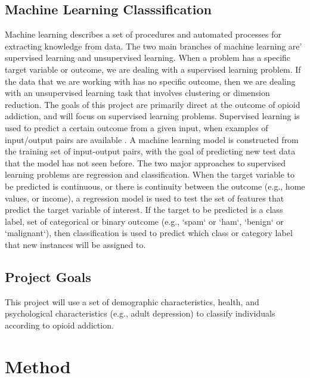 \documentclass[sigconf]{acmart}
\begin{document}
\subsection{Machine Learning Classsification} 

Machine learning describes a set of procedures and automated processes for 
extracting knowledge from data. The two main branches of machine learning are'
supervised learning and unsupervised learning. When a problem has a specific 
target variable or outcome, we are dealing with a supervised learning problem. 
If the data that we are working with has no specific outcome, then we are
dealing with an unsupervised learning task that involves clustering or 
dimension reduction. The goals of this project are primarily direct at the 
outcome of opioid addiction, and will focus on supervised learning problems. 
Supervised learning is used to predict a certain outcome from a given input,
when examples of input/output pairs are available \cite{muller17}. A machine
learning model is constructed from the training set of input-output pairs, 
with the goal of predicting new test data that the model has not seen before. 
The two major approaches to supervised learning problems are regression and
classification. When the target variable to be predicted is continuous, or
there is continuity between the outcome (e.g., home values, or income), a 
regression model is used to test the set of features that predict the target 
variable of interest. If the target to be predicted is a class label, set of 
categorical or binary outcome (e.g., `spam` or `ham`, `benign` or `malignant`), 
then classification is used to predict which class or category label that 
new instances will be assigned to. \cite{raschka17}

\subsection{Project Goals} 
This project will use a set of demographic characteristics, health, and 
psychological characteristics (e.g., adult depression) to classify individuals 
according to opioid addiction. 


\section{Method}
\end{document}
